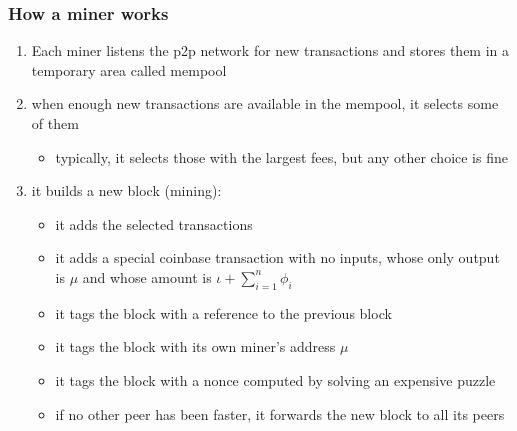 \documentclass[11pt]{beamer}  %
\begin{document}
\begin{frame}\frametitle{How a miner works}

  \begin{enumerate}
    \item Each miner listens the p2p network for new transactions and stores them in a
      temporary area called mempool
    \item when enough new transactions are available in the mempool, it selects some of them
      \begin{itemize}
      \item typically, it selects those with the largest fees, but any other choice is fine
      \end{itemize}
    \item it builds a new block (\alert{mining}):
      \begin{itemize}
      \item it adds the selected transactions
      \item it adds a special \alert{coinbase transaction} with no inputs, whose only output is $\mu$
        and whose amount is $\iota+\sum_{i=1}^n\phi_i$
      \item it tags the block with a reference to the previous block
      \item it tags the block with its own miner's address $\mu$
      \item it tags the block with a nonce computed by solving an expensive puzzle
      \item if no other peer has been faster, it forwards the new block to all its peers
      \end{itemize}
  \end{enumerate}
\end{frame}
\end{document}
